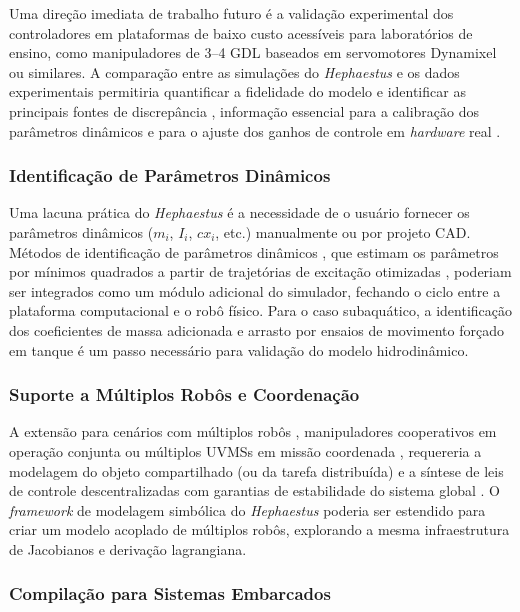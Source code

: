 Uma direção imediata de trabalho futuro é a validação experimental dos controladores em plataformas de baixo custo acessíveis para laboratórios de ensino, como manipuladores de 3--4 GDL baseados em servomotores Dynamixel ou similares. A comparação entre as simulações do \textit{Hephaestus} e os dados experimentais permitiria quantificar a fidelidade do modelo e identificar as principais fontes de discrepância , informação essencial para a calibração dos parâmetros dinâmicos e para o ajuste dos ganhos de controle em \textit{hardware} real \cite{spong2020robot, siciliano2009robotics}.

\subsubsection*{Identificação de Parâmetros Dinâmicos}

Uma lacuna prática do \textit{Hephaestus} é a necessidade de o usuário fornecer os parâmetros dinâmicos ($m_i$, $I_i$, $cx_i$, etc.) manualmente ou por projeto CAD. Métodos de identificação de parâmetros dinâmicos , que estimam os parâmetros por mínimos quadrados a partir de trajetórias de excitação otimizadas \cite{siciliano2009robotics, spong2020robot} , poderiam ser integrados como um módulo adicional do simulador, fechando o ciclo entre a plataforma computacional e o robô físico. Para o caso subaquático, a identificação dos coeficientes de massa adicionada e arrasto por ensaios de movimento forçado em tanque \cite{fossen2011handbook, newman1977marine} é um passo necessário para validação do modelo hidrodinâmico.

\subsubsection*{Suporte a Múltiplos Robôs e Coordenação}

A extensão para cenários com múltiplos robôs , manipuladores cooperativos em operação conjunta \cite{siciliano2009robotics} ou múltiplos UVMSs em missão coordenada \cite{antonelli2014modelling} , requereria a modelagem do objeto compartilhado (ou da tarefa distribuída) e a síntese de leis de controle descentralizadas com garantias de estabilidade do sistema global \cite{chiaverini1997singularity}. O \textit{framework} de modelagem simbólica do \textit{Hephaestus} poderia ser estendido para criar um modelo acoplado de múltiplos robôs, explorando a mesma infraestrutura de Jacobianos e derivação lagrangiana.

\subsubsection*{Compilação para Sistemas Embarcados}


